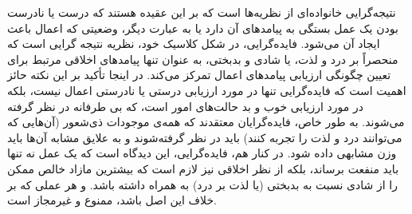 نتیجه‌گرایی خانواده‌ای از نظریه‌ها است که بر این عقیده هستند که درست یا نادرست بودن یک عمل بستگی به پیامدهای آن دارد یا به عبارت دیگر، وضعیتی که اعمال باعث ایجاد آن می‌شود.
فایده‌گرایی، در شکل کلاسیک خود، نظریه نتیجه گرایی است که منحصراً بر درد و لذت، یا شادی و بدبختی، به عنوان تنها پیامدهای اخلاقی مرتبط برای تعیین چگونگی ارزیابی پیامدهای اعمال تمرکز می‌کند.
در اینجا تأکید بر این نکته حائز اهمیت است که فایده‌گرایی تنها در مورد ارزیابی درستی یا نادرستی اعمال نیست، بلکه در مورد ارزیابی خوب و بد حالت‌های امور است، که بی طرفانه در نظر گرفته می‌شوند.
به طور خاص، فایده‌گرایان معتقدند که همه‌ی موجودات ذی‌شعور (آن‌هایی که می‌توانند درد و لذت را تجربه کنند) باید در نظر گرفته‌شوند و به علایق مشابه آن‌ها باید وزن مشابهی داده شود.
در کنار هم، فایده‌گرایی، این دیدگاه است که یک عمل نه تنها باید منفعت برساند، بلکه از نظر اخلاقی نیز لازم است که بیشترین مازاد خالص ممکن را از شادی نسبت به بدبختی (یا لذت بر درد) به همراه داشته باشد.
و هر عملی که بر خلاف این اصل باشد، ممنوع و غیرمجاز است.

\newpage

